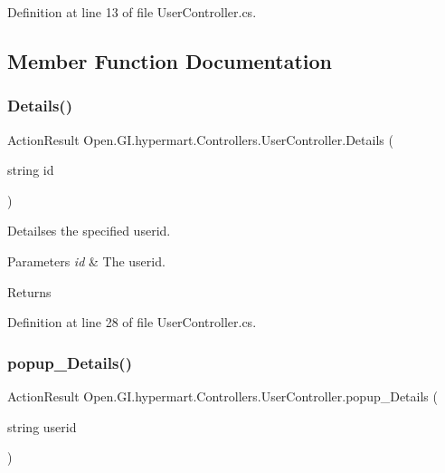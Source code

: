Definition at line 13 of file User\+Controller.\+cs.



\subsection{Member Function Documentation}
\mbox{\label{class_open_1_1_g_i_1_1hypermart_1_1_controllers_1_1_user_controller_a4627a7a94b713760f00050bac936a54f}} 
\subsubsection{Details()}
{\footnotesize\ttfamily Action\+Result Open.\+G\+I.\+hypermart.\+Controllers.\+User\+Controller.\+Details (\begin{DoxyParamCaption}\item[{string}]{id }\end{DoxyParamCaption})}



Detailses the specified userid. 


\begin{DoxyParams}{Parameters}
{\em id} & The userid.\\
\hline
\end{DoxyParams}
\begin{DoxyReturn}{Returns}

\end{DoxyReturn}


Definition at line 28 of file User\+Controller.\+cs.

\mbox{\label{class_open_1_1_g_i_1_1hypermart_1_1_controllers_1_1_user_controller_a3168162b86edbdbd30a593fa6aca8e9f}} 
\subsubsection{popup\+\_\+\+Details()}
{\footnotesize\ttfamily Action\+Result Open.\+G\+I.\+hypermart.\+Controllers.\+User\+Controller.\+popup\+\_\+\+Details (\begin{DoxyParamCaption}\item[{string}]{userid }\end{DoxyParamCaption})}



